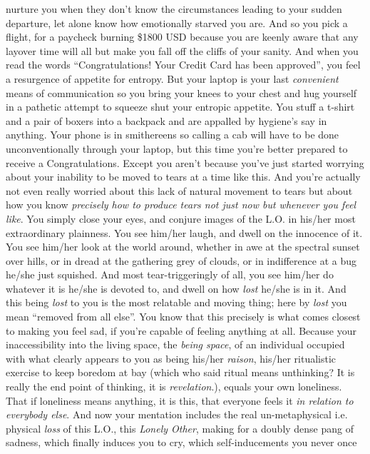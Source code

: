 \documentclass{article}
\begin{document}
nurture you when they don't know the circumstances leading to your
sudden departure, let alone know how emotionally starved you are. And so
you pick a flight, for a paycheck burning \$1800 USD because you are
keenly aware that any layover time will all but make you fall off the
cliffs of your sanity. And when you read the words ``Congratulations!
Your Credit Card has been approved'', you feel a resurgence of appetite
for entropy. But your laptop is your last \textit{convenient} means of
communication so you bring your knees to your chest and hug yourself in
a pathetic attempt to squeeze shut your entropic appetite. You stuff
a t-shirt and a pair of boxers into a backpack and are appalled by
hygiene's say in anything. Your phone is in smithereens so calling a cab
will have to be done unconventionally through your laptop, but this time
you're better prepared to receive a Congratulations. Except you aren't
because you've just started worrying about your inability to be moved to
tears at a time like this. And you're actually not even really worried
about this lack of natural movement to tears but about how you know
\textit{precisely how to produce tears not just now but whenever you
feel like}. You simply close your eyes, and conjure images of the L.O.
in his/her most extraordinary plainness. You see him/her laugh, and
dwell on the innocence of it. You see him/her look at the world around,
whether in awe at the spectral sunset over hills, or in dread at the
gathering grey of clouds, or in indifference at a bug he/she just
squished. And most tear-triggeringly of all, you see him/her do whatever
it is he/she is devoted to, and dwell on how \textit{lost} he/she is in
it. And this being \textit{lost} to you is the most relatable and moving
thing; here by \textit{lost} you mean ``removed from all else''. You
know that this precisely is what comes closest to making you feel sad,
if you're capable of feeling anything at all. Because your
inaccessibility into the living space, the \textit{being space}, of an
individual occupied with what clearly appears to you as being his/her
\textit{raison}, his/her ritualistic exercise to keep boredom at bay
(which who said ritual means unthinking? It is really the end point of
thinking, it is \textit{revelation}.), equals your own loneliness. That
if loneliness means anything, it is this, that everyone feels it
\textit{in relation to everybody else}. And now your mentation includes
the real un-metaphysical i.e. physical \textit{loss} of this L.O., this
\textit{Lonely Other}, making for a doubly dense pang of sadness, which
finally induces you to cry, which self-inducements you never once
\end{document}
